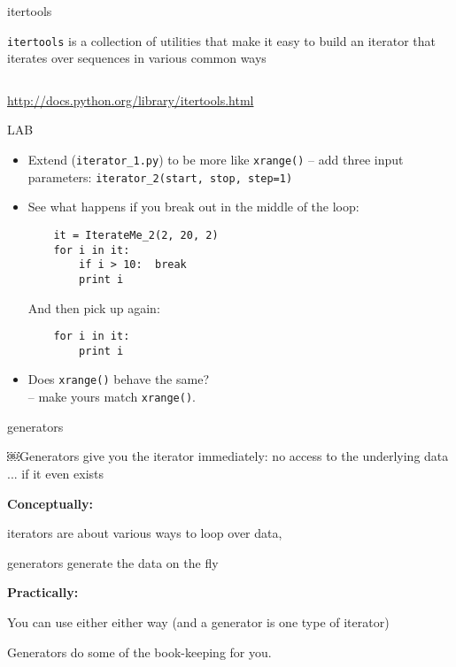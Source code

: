 \documentclass{beamer}
\begin{document}
\begin{frame}[fragile]{itertools}

{\Large \verb|itertools| is a collection of utilities that make it easy to
build an iterator that iterates over sequences in various common ways}

\begin{verbatim}

\end{verbatim}

\url{http://docs.python.org/library/itertools.html}

\end{frame}

\begin{frame}[fragile]{LAB}

\begin{itemize}
  \item  Extend (\verb|iterator_1.py|) to be more like \verb|xrange()| --
         add three input parameters: \verb|iterator_2(start, stop, step=1)|
  \item  See what happens if you break out in the middle of the loop:
\begin{verbatim}
    it = IterateMe_2(2, 20, 2)
    for i in it:
        if i > 10:  break
        print i
\end{verbatim}
And then pick up again:
\begin{verbatim}
    for i in it:
        print i
\end{verbatim}
  \item  Does \verb|xrange()| behave the same?\\
          -- make yours match \verb|xrange()|.
\end{itemize}
\end{frame}

\begin{frame}[fragile]{generators}

\Large{￼Generators give you the iterator immediately:
no access to the underlying data ... if it even exists}

\vfill
{\bf Conceptually:}

iterators are about various ways to loop over data,

generators generate the data on the fly

\vfill
{\bf Practically:}

You can use either either way (and a generator is one type of iterator)

Generators do some of the book-keeping for you.

\end{frame}
\end{document}

